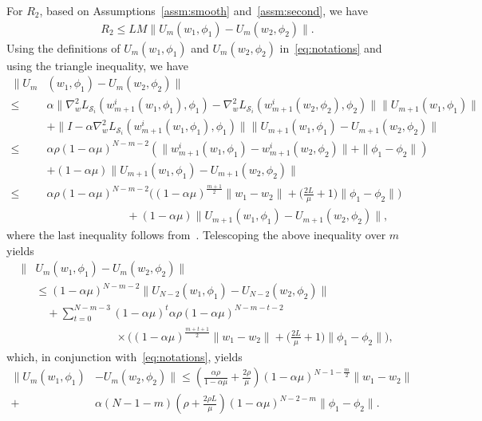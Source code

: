 \documentclass{osudissert96}
\begin{document}
For $R_2$, based on Assumptions~\ref{assm:smooth} and~\ref{assm:second}, we have
\begin{align}\label{eq:rfist}
R_2\leq LM\|U_m(w_1,\phi_1)-U_m(w_2,\phi_2)\|.
\end{align}
Using the definitions of $U_m(w_1,\phi_1)$ and $U_m(w_2,\phi_2)$ in~\cref{eq:notations} and using the triangle inequality, we have 
\begin{align*}
\|U_m&(w_1,\phi_1)-U_m(w_2,\phi_2)\|  \nonumber
\\\leq& \alpha \|\nabla_w^2L_{\mathcal{S}_i}(w_{m+1}^i(w_1,\phi_1),\phi_1)-\nabla_w^2L_{\mathcal{S}_i}(w_{m+1}^i(w_2,\phi_2),\phi_2)\| \|U_{m+1}(w_1,\phi_1)\| \nonumber
\\&+ \|I-\alpha\nabla_w^2L_{\mathcal{S}_i}(w_{m+1}^i(w_1,\phi_1),\phi_1)\| \|U_{m+1}(w_1,\phi_1)-U_{m+1}(w_2,\phi_2)\| \nonumber
\\\leq&\alpha \rho (1-\alpha \mu)^{N-m-2}(\|w_{m+1}^i(w_1,\phi_1)-w_{m+1}^i(w_2,\phi_2)\| + \|\phi_1-\phi_2\|) \nonumber
\\&+ (1-\alpha \mu)\|U_{m+1}(w_1,\phi_1)-U_{m+1}(w_2,\phi_2)\| \nonumber
\\\leq&\alpha \rho (1-\alpha \mu)^{N-m-2}\Big((1-\alpha\mu)^{\frac{m+1}{2}}  \|w_1-w_2\| +  \Big(\frac{2L}{\mu}+1\Big)\|\phi_1-\phi_2\|\Big) \nonumber
\\&\hspace{3cm}+ (1-\alpha \mu)\|U_{m+1}(w_1,\phi_1)-U_{m+1}(w_2,\phi_2)\|,
\end{align*} 
where the last  inequality follows from~.  
Telescoping the above inequality over $m$ yields
\begin{align}
\|&U_m(w_1,\phi_1)-U_m(w_2,\phi_2)\| \nonumber
\\&\leq (1-\alpha\mu)^{N-m-2}\|U_{N-2}(w_1,\phi_1)-U_{N-2}(w_2,\phi_2)\|  \nonumber
\\&\quad+\sum_{t=0}^{N-m-3} (1-\alpha\mu)^{t}\alpha \rho (1-\alpha \mu)^{N-m-t-2} \nonumber
\\&\hspace{3cm}\times\Big((1-\alpha\mu)^{\frac{m+t+1}{2}}  \|w_1-w_2\| +  \Big(\frac{2L}{\mu}+1\Big)\|\phi_1-\phi_2\|\Big),\nonumber
\end{align}
which, in conjunction with~\cref{eq:notations}, yields
\begin{align}\label{eq:ggsmida}
\|U_m(w_1,\phi_1)&-U_m(w_2,\phi_2)\| \leq \left( \frac{\alpha\rho}{1-\alpha\mu}+\frac{2\rho}{\mu}\right)(1-\alpha\mu)^{N-1-\frac{m}{2}}\|w_1-w_2\|  \nonumber
\\+&\alpha(N-1-m)\left( \rho+\frac{2\rho L}{\mu} \right)(1-\alpha\mu)^{N-2-m}\|\phi_1-\phi_2\|.
\end{align}
\end{document}
